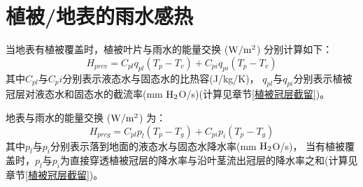 \section{植被/地表的雨水感热}\label{植被地表的雨水感热}
当地表有植被覆盖时，植被叶片与雨水的能量交换 ($\rm W/m^2$) 分别计算如下：
\begin{equation}
H_{p r c v}=C_{p l} q_{p l}\left(T_{p}-T_{v}\right)+C_{p i} q_{p i}\left(T_{p}-T_{v}\right)
\end{equation}
%
其中$C_{pl}$与$C_pi$分别表示液态水与固态水的比热容(J/kg/K)，
$q_{pl}$与$q_{pi}$分别表示植被冠层对液态水和固态水的截流率(mm $\rm H_2$O/s)(计算见章节\ref{植被冠层截留})。


地表与雨水的能量交换 ($\rm W/m^2$) 为：
\begin{equation}
H_{p r c g}=C_{p l} p_{l}\left(T_{p}-T_{g}\right)+C_{p i} p_{i}\left(T_{p}-T_{g}\right)
\end{equation}
其中$p_l$与$p_i$分别表示落到地面的液态水与固态水降水率(mm $\rm H_2$O/s)，
当有植被覆盖时，$p_l$与$p_i$为直接穿透植被冠层的降水率与沿叶茎流出冠层的降水率之和(计算见章节\ref{植被冠层截留})。

